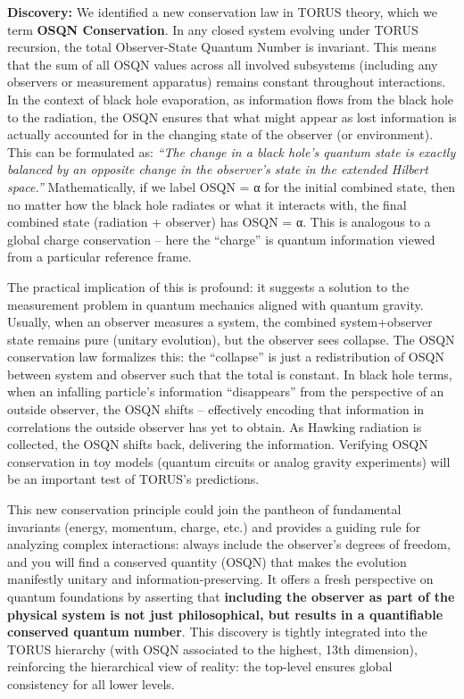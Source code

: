\documentclass[]{article}
\begin{document}
\textbf{Discovery:} We identified a new conservation law in TORUS
theory, which we term \textbf{OSQN Conservation}. In any closed system
evolving under TORUS recursion, the total Observer-State Quantum Number
is invariant. This means that the sum of all OSQN values across all
involved subsystems (including any observers or measurement apparatus)
remains constant throughout interactions. In the context of black hole
evaporation, as information flows from the black hole to the radiation,
the OSQN ensures that what might appear as lost information is actually
accounted for in the changing state of the observer (or environment).
This can be formulated as: \emph{``The change in a black hole's quantum
state is exactly balanced by an opposite change in the observer's state
in the extended Hilbert space.''} Mathematically, if we label OSQN = α
for the initial combined state, then no matter how the black hole
radiates or what it interacts with, the final combined state (radiation
+ observer) has OSQN = α. This is analogous to a global charge
conservation -- here the ``charge'' is quantum information viewed from a
particular reference frame.

The practical implication of this is profound: it suggests a solution to
the measurement problem in quantum mechanics aligned with quantum
gravity. Usually, when an observer measures a system, the combined
system+observer state remains pure (unitary evolution), but the observer
sees collapse. The OSQN conservation law formalizes this: the
``collapse'' is just a redistribution of OSQN between system and
observer such that the total is constant. In black hole terms, when an
infalling particle's information ``disappears'' from the perspective of
an outside observer, the OSQN shifts -- effectively encoding that
information in correlations the outside observer has yet to obtain. As
Hawking radiation is collected, the OSQN shifts back, delivering the
information. Verifying OSQN conservation in toy models (quantum circuits
or analog gravity experiments) will be an important test of TORUS's
predictions.

This new conservation principle could join the pantheon of fundamental
invariants (energy, momentum, charge, etc.) and provides a guiding rule
for analyzing complex interactions: always include the observer's
degrees of freedom, and you will find a conserved quantity (OSQN) that
makes the evolution manifestly unitary and information-preserving. It
offers a fresh perspective on quantum foundations by asserting that
\textbf{including the observer as part of the physical system is not
just philosophical, but results in a quantifiable conserved quantum
number}. This discovery is tightly integrated into the TORUS hierarchy
(with OSQN associated to the highest, 13th dimension), reinforcing the
hierarchical view of reality: the top-level ensures global consistency
for all lower levels.
\end{document}
